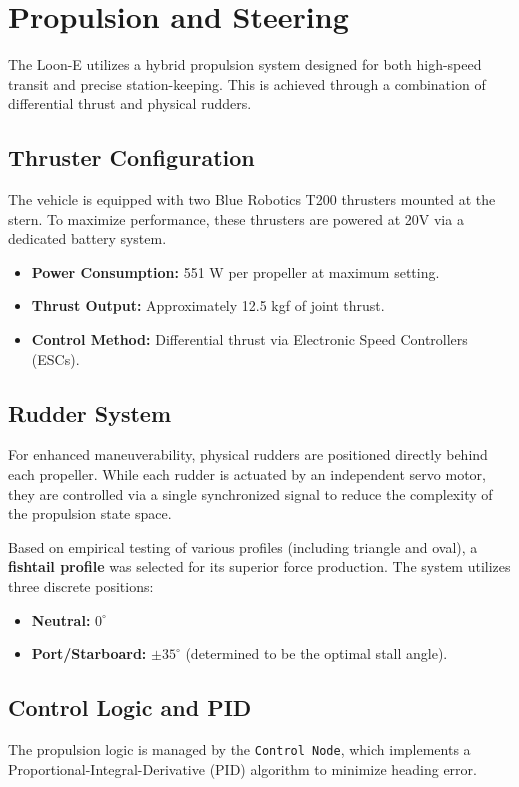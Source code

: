 \section{Propulsion and Steering}
\label{sec:propulsion}

The Loon-E utilizes a hybrid propulsion system designed for both high-speed transit and precise station-keeping. This is achieved through a combination of differential thrust and physical rudders.

\subsection{Thruster Configuration}
The vehicle is equipped with two Blue Robotics T200 thrusters mounted at the stern. To maximize performance, these thrusters are powered at 20V via a dedicated battery system. 

\begin{itemize}
    \item \textbf{Power Consumption:} 551 W per propeller at maximum setting.
    \item \textbf{Thrust Output:} Approximately 12.5 kgf of joint thrust.
    \item \textbf{Control Method:} Differential thrust via Electronic Speed Controllers (ESCs).
\end{itemize}

\subsection{Rudder System}
For enhanced maneuverability, physical rudders are positioned directly behind each propeller. While each rudder is actuated by an independent servo motor, they are controlled via a single synchronized signal to reduce the complexity of the propulsion state space.

Based on empirical testing of various profiles (including triangle and oval), a \textbf{fishtail profile} was selected for its superior force production. The system utilizes three discrete positions:
\begin{itemize}
    \item \textbf{Neutral:} $0^{\circ}$
    \item \textbf{Port/Starboard:} $\pm35^{\circ}$ (determined to be the optimal stall angle).
\end{itemize}

\subsection{Control Logic and PID}
The propulsion logic is managed by the \texttt{Control Node}, which implements a Proportional-Integral-Derivative (PID) algorithm to minimize heading error.

